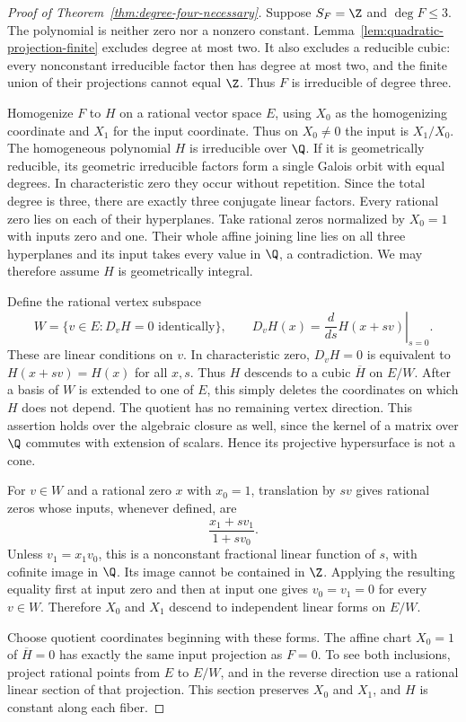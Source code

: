 \begin{proof}[Proof of Theorem~\ref{thm:degree-four-necessary}]
Suppose $S_F=\Z$ and $\deg F\leq3$.  The polynomial is neither zero
nor a nonzero constant.  Lemma~\ref{lem:quadratic-projection-finite}
excludes degree at most two.  It also excludes a reducible cubic:
every nonconstant irreducible factor then has degree at most two,
and the finite union of their projections cannot equal $\Z$.
Thus $F$ is irreducible of degree three.

Homogenize $F$ to $H$ on a rational vector space $E$, using $X_0$ as
the homogenizing coordinate and $X_1$ for the input coordinate.
Thus on $X_0\ne0$ the input is $X_1/X_0$.
The homogeneous polynomial $H$ is irreducible over $\Q$.
If it is geometrically reducible, its geometric irreducible factors
form a single Galois orbit with equal degrees.  In characteristic
zero they occur without repetition.  Since the total degree is
three, there are exactly three conjugate linear factors.
Every rational zero lies on each of their hyperplanes.
Take rational zeros normalized by $X_0=1$ with inputs zero and one.
Their whole affine joining line lies on all three hyperplanes and
its input takes every value in $\Q$, a contradiction.
We may therefore assume $H$ is geometrically integral.

Define the rational vertex subspace
\[
 W=\{v\in E:D_vH=0\text{ identically}\},\qquad
 D_vH(x)=\left.\frac{d}{ds}H(x+sv)\right|_{s=0}.
\]
These are linear conditions on $v$.  In characteristic zero,
$D_vH=0$ is equivalent to $H(x+sv)=H(x)$ for all $x,s$.
Thus $H$ descends to a cubic $\overline H$ on $E/W$.
After a basis of $W$ is extended to one of $E$, this simply deletes
the coordinates on which $H$ does not depend.
The quotient has no remaining vertex direction.  This assertion
holds over the algebraic closure as well, since the kernel of a
matrix over $\Q$ commutes with extension of scalars.  Hence its
projective hypersurface is not a cone.

For $v\in W$ and a rational zero $x$ with $x_0=1$, translation by
$sv$ gives rational zeros whose inputs, whenever defined, are
\[
 \frac{x_1+s v_1}{1+s v_0}.
\]
Unless $v_1=x_1v_0$, this is a nonconstant fractional linear function
of $s$, with cofinite image in $\Q$.  Its image cannot be contained
in $\Z$.  Applying the resulting equality first at input zero and
then at input one gives $v_0=v_1=0$ for every $v\in W$.
Therefore $X_0$ and $X_1$ descend to independent linear forms on
$E/W$.

Choose quotient coordinates beginning with these forms.
The affine chart $X_0=1$ of $\overline H=0$ has exactly the same
input projection as $F=0$.  To see both inclusions, project rational
points from $E$ to $E/W$, and in the reverse direction use a rational
linear section of that projection.  This section preserves $X_0$
and $X_1$, and $H$ is constant along each fiber.


\end{proof}

